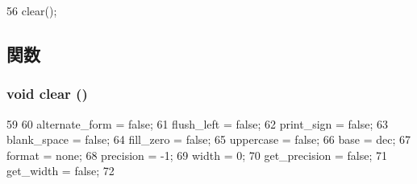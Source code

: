 \begin{DoxyCode}
56 { clear(); }
\end{DoxyCode}


\subsection{関数}
\hypertarget{structcp_1_1Format_ac8bb3912a3ce86b15842e79d0b421204}{
\subsubsection[{clear}]{\setlength{\rightskip}{0pt plus 5cm}void clear ()}}
\label{structcp_1_1Format_ac8bb3912a3ce86b15842e79d0b421204}



\begin{DoxyCode}
59     {
60         alternate_form = false;
61         flush_left = false;
62         print_sign = false;
63         blank_space = false;
64         fill_zero = false;
65         uppercase = false;
66         base = dec;
67         format = none;
68         precision = -1;
69         width = 0;
70         get_precision = false;
71         get_width = false;
72     }
\end{DoxyCode}


